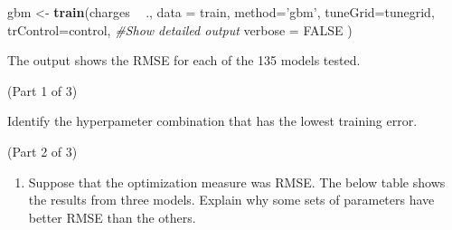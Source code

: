 \documentclass[openany]{book}
\newenvironment{Shaded}{\begin{snugshade}}{\end{snugshade}}
\newcommand{\CommentTok}[1]{\textcolor[rgb]{0.56,0.35,0.01}{\textit{#1}}}
\newcommand{\DataTypeTok}[1]{\textcolor[rgb]{0.13,0.29,0.53}{#1}}
\newcommand{\DecValTok}[1]{\textcolor[rgb]{0.00,0.00,0.81}{#1}}
\newcommand{\KeywordTok}[1]{\textcolor[rgb]{0.13,0.29,0.53}{\textbf{#1}}}
\newcommand{\NormalTok}[1]{#1}
\newcommand{\OperatorTok}[1]{\textcolor[rgb]{0.81,0.36,0.00}{\textbf{#1}}}
\newcommand{\OtherTok}[1]{\textcolor[rgb]{0.56,0.35,0.01}{#1}}
\newcommand{\StringTok}[1]{\textcolor[rgb]{0.31,0.60,0.02}{#1}}
\providecommand{\tightlist}{%
  \setlength{\itemsep}{0pt}\setlength{\parskip}{0pt}}
\begin{document}
\begin{Shaded}
\begin{Highlighting}[]
\NormalTok{gbm <-}\StringTok{ }\KeywordTok{train}\NormalTok{(charges }\OperatorTok{~}\StringTok{ }\NormalTok{.,}
            \DataTypeTok{data =}\NormalTok{ train,}
            \DataTypeTok{method=}\StringTok{'gbm'}\NormalTok{, }
            \DataTypeTok{tuneGrid=}\NormalTok{tunegrid, }
            \DataTypeTok{trControl=}\NormalTok{control,}
            \CommentTok{#Show detailed output}
            \DataTypeTok{verbose =} \OtherTok{FALSE}
\NormalTok{            )}
\end{Highlighting}
\end{Shaded}

The output shows the RMSE for each of the 135 models tested.

(Part 1 of 3)

Identify the hyperpameter combination that has the lowest training error.

(Part 2 of 3)

\begin{enumerate}
\def\labelenumi{\arabic{enumi}.}
\setcounter{enumi}{1}
\tightlist
\item
  Suppose that the optimization measure was RMSE. The below table shows the results from three models. Explain why some sets of parameters have better RMSE than the others.
\end{enumerate}

\begin{Shaded}
\end{Shaded}
\end{document}
